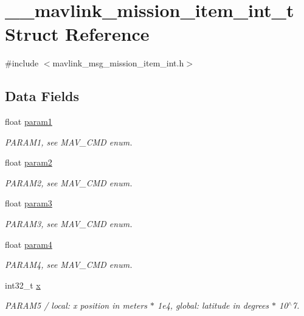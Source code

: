 \hypertarget{struct____mavlink__mission__item__int__t}{\section{\+\_\+\+\_\+mavlink\+\_\+mission\+\_\+item\+\_\+int\+\_\+t Struct Reference}
\label{struct____mavlink__mission__item__int__t}
}


{\ttfamily \#include $<$mavlink\+\_\+msg\+\_\+mission\+\_\+item\+\_\+int.\+h$>$}

\subsection*{Data Fields}
\begin{DoxyCompactItemize}
\item 
float \hyperlink{struct____mavlink__mission__item__int__t_a947010581e9d8eec7b617c7e14ced78d}{param1}
\begin{DoxyCompactList}\small\item\em P\+A\+R\+A\+M1, see M\+A\+V\+\_\+\+C\+M\+D enum. \end{DoxyCompactList}\item 
float \hyperlink{struct____mavlink__mission__item__int__t_a9a8dd77417a4c3c1ea6f4587138cb8e6}{param2}
\begin{DoxyCompactList}\small\item\em P\+A\+R\+A\+M2, see M\+A\+V\+\_\+\+C\+M\+D enum. \end{DoxyCompactList}\item 
float \hyperlink{struct____mavlink__mission__item__int__t_a11b97ff7962bfecc218837dbd230a0bc}{param3}
\begin{DoxyCompactList}\small\item\em P\+A\+R\+A\+M3, see M\+A\+V\+\_\+\+C\+M\+D enum. \end{DoxyCompactList}\item 
float \hyperlink{struct____mavlink__mission__item__int__t_a39455b9454448ecb51e440481945b09e}{param4}
\begin{DoxyCompactList}\small\item\em P\+A\+R\+A\+M4, see M\+A\+V\+\_\+\+C\+M\+D enum. \end{DoxyCompactList}\item 
int32\+\_\+t \hyperlink{struct____mavlink__mission__item__int__t_acb2e18b8ef9650b44d3fdd0600e07df2}{x}
\begin{DoxyCompactList}\small\item\em P\+A\+R\+A\+M5 / local\+: x position in meters $\ast$ 1e4, global\+: latitude in degrees $\ast$ 10$^\wedge$7. \end{DoxyCompactList}\item 

\end{DoxyCompactItemize}
